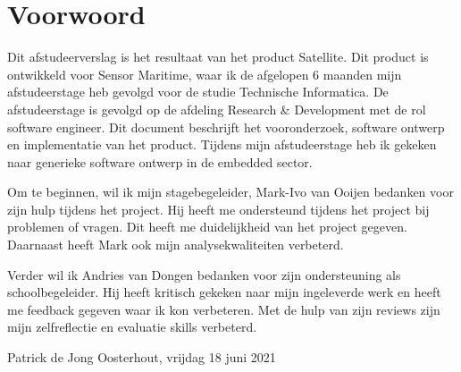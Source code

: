 \chapter*{Voorwoord}
Dit afstudeerverslag is het resultaat van het product Satellite. Dit product is ontwikkeld voor Sensor Maritime, waar ik de afgelopen 6 maanden mijn afstudeerstage heb gevolgd voor de studie Technische Informatica. De afstudeerstage is gevolgd op de afdeling Research \& Development met de rol software engineer. Dit document beschrijft het vooronderzoek, software ontwerp en implementatie van het product. Tijdens mijn afstudeerstage heb ik gekeken naar generieke software ontwerp in de embedded sector. \newline

\noindent Om te beginnen, wil ik mijn stagebegeleider, Mark-Ivo van Ooijen bedanken voor zijn hulp tijdens het project. Hij heeft me ondersteund tijdens het project bij problemen of vragen. Dit heeft me duidelijkheid van het project gegeven. Daarnaast heeft Mark ook mijn analysekwaliteiten verbeterd. \newline 

\noindent Verder wil ik Andries van Dongen bedanken voor zijn ondersteuning als schoolbegeleider. Hij heeft kritisch gekeken naar mijn ingeleverde werk en heeft me feedback gegeven waar ik kon verbeteren. Met de hulp van zijn reviews zijn mijn zelfreflectie en evaluatie skills verbeterd. \newline

\noindent Patrick de Jong \newline
\noindent Oosterhout, vrijdag 18 juni 2021